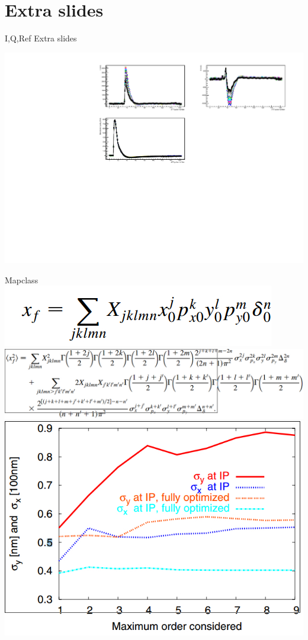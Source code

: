\documentclass{beamer}
\begin{document}
\section[.]{Extra slides}
\begin{frame}{I,Q,Ref}
 \color{blue}\Large Extra slides
\end{frame}
\begin{frame}
 \includegraphics[scale=0.6]{IPBy_sample.pdf}
\end{frame}
\begin{frame}{Mapclass}
 \includegraphics[scale=0.3]{xdecomp.jpg}\\
\includegraphics[scale=0.3]{beamcomp.jpg}\\
\includegraphics[scale=0.3]{orderscomp.jpg}
\end{frame}
\end{document}
